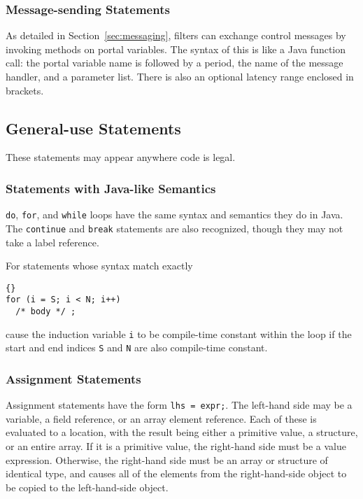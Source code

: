 \documentclass[11pt]{article}
\begin{document}
\subsubsection{Message-sending Statements}

As detailed in Section~\ref{sec:messaging}, filters can exchange
control messages by invoking methods on portal variables.  The syntax
of this is like a Java function call: the portal variable name is
followed by a period, the name of the message handler, and a parameter
list.  There is also an optional latency range enclosed in brackets.

\newpage
\subsection{General-use Statements}

These statements may appear anywhere code is legal.

\subsubsection{Statements with Java-like Semantics}

\lstinline|do|, \lstinline|for|, and \lstinline|while| loops have the same
syntax and semantics they do in Java.  The \lstinline|continue| and
\lstinline|break| statements are also recognized, though they may not
take  a label reference.

For statements whose syntax match exactly

\begin{lstlisting}{}
for (i = S; i < N; i++)
  /* body */ ;
\end{lstlisting}

\noindent
cause the induction variable \lstinline|i| to be compile-time constant
within the loop if the start and end indices \lstinline|S| and \lstinline|N| are
also compile-time constant.

\subsubsection{Assignment Statements}

Assignment statements have the form \lstinline|lhs = expr;|.  The left-hand
side may be a variable, a field reference, or an array element
reference.  Each of these is evaluated to a location, with the result
being either a primitive value, a structure, or an entire array.  If
it is a primitive value, the right-hand side must be a value
expression.  Otherwise, the right-hand side must be an array or
structure of identical type, and causes all of the elements from the
right-hand-side object to be copied to the left-hand-side object.
\end{document}
